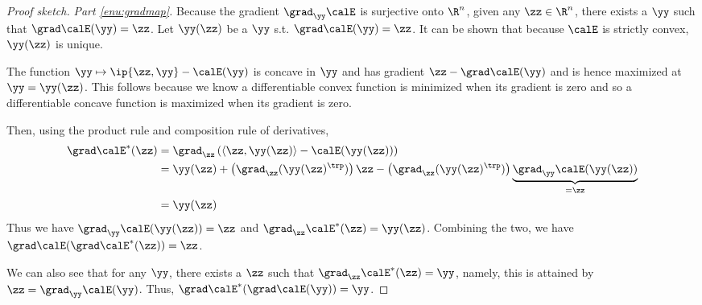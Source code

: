 \begin{proof}[Proof sketch]
  \emph{Part \ref{enu:gradmap}.}
  Because the gradient $\grad_{\yy}\calE$ is surjective onto $\R^n$,
  given any $\zz \in \R^n$, there exists a $\yy$ such that $\grad
  \calE(\yy) = \zz$.  Let $\yy(\zz)$ be a $\yy$ s.t. $\grad
  \calE(\yy) = \zz$.
  It can be shown that because $\calE$ is strictly convex, $\yy(\zz)$
  is unique.
  
  The function $\yy \mapsto \ip{\zz, \yy} - \calE(\yy) $ is concave in
  $\yy$ and has gradient $\zz - \grad \calE(\yy)$ and is hence
  maximized at $\yy = \yy(\zz)$. This follows because we know a
  differentiable convex function is  minimized when its gradient is zero and so a differentiable concave function is
  maximized when its gradient is zero.
  
 Then, using the product rule and composition rule of derivatives,
  \begin{align*}
    \grad\calE^*(\zz) &= \grad_{\zz} \left(\langle\zz,\yy(\zz)\rangle - \calE(\yy(\zz))\right) \\
    &= \yy(\zz) + \left( \grad_{\zz}(\yy(\zz)^{\trp})\right)\zz - \left( \grad_{\zz}(\yy(\zz)^{\trp})\right)
    \underbrace{\grad_{\yy}\calE(\yy(\zz))}_{=\zz}\\
    &= \yy(\zz)
  \end{align*}
  Thus we have $\grad_{\yy}\calE(\yy(\zz)) = \zz$ and
  $\grad_{\zz}\calE^*(\zz)=\yy(\zz)$.
  Combining the two, we have $\grad\calE(\grad\calE^*(\zz))=\zz$.


We can also see that for any $\yy$, there exists a $\zz$ such that
$\grad_{\zz}\calE^*(\zz)=\yy$, namely, this is attained by $\zz =
\grad_{\yy}\calE(\yy)$.
Thus, $\grad\calE^*(\grad\calE(\yy))=\yy$.








\end{proof}
